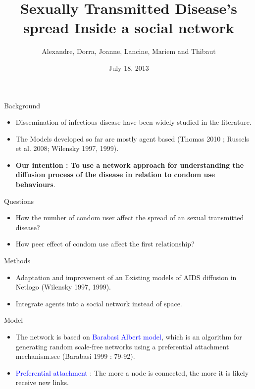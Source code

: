 \documentclass{beamer}
\title[Ghonorre grimpante's dissemination]{Sexually Transmitted Disease's spread Inside a social network}
\author{Alexandre, Dorra, Joanne, Lancine, Mariem and Thibaut}
\institute{CSSS 2013, Le Havre}
\date{July 18, 2013}
\begin{document}
\begin{frame}
	\titlepage
\end{frame}

\begin{frame}{Background}
	\begin{itemize}[<+->]
		\item Dissemination of infectious disease have been widely studied in the literature.
		\item The Models developed so far are mostly agent based (Thomas 2010 ; Russels et al. 2008;   Wilensky 1997, 1999).
		\item {\bf{Our intention : To use a network approach for understanding the diffusion process of the disease in relation to condom use behaviours}}.
	\end{itemize}
\end{frame}

\begin{frame}{Questions}
	\begin{itemize}[<+->]
		\item How the number of condom user affect the spread of an sexual transmitted disease?
		\item How peer effect of condom use affect the first relationship?
	\end{itemize}
\end{frame}

\begin{frame}{Methods}
	\begin{itemize}[<+->]
		\item Adaptation and improvement of an Existing models of AIDS diffusion in Netlogo (Wilensky 1997, 1999).
		\item Integrate agents into a social network instead of space.
	\end{itemize}
\end{frame}

\begin{frame}{Model}
	\begin{itemize}
		\item The network is based on \textcolor{blue}{Barabasi Albert model}, which is an algorithm for generating random scale-free networks using a preferential attachment mechanism.see (Barabasi 1999  : 79-92).
		\item \textcolor{blue}{Preferential attachment} : The more a node is connected, the more it is likely receive new links. 
	\end{itemize}
\end{frame}
\end{document}
